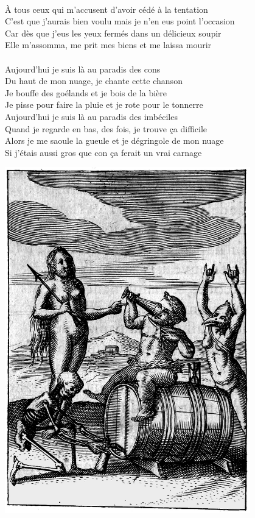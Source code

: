 \\À tous ceux qui m'accusent d'avoir cédé à la tentation
\\C'est que j'aurais bien voulu mais je n'en eus point l'occasion
\\Car dès que j'eus les yeux fermés dans un délicieux soupir
\\Elle m'assomma, me prit mes biens et me laissa mourir
\\\\Aujourd'hui je suis là au paradis des cons
\\Du haut de mon nuage, je chante cette chanson
\\Je bouffe des goélands et je bois de la bière
\\Je pisse pour faire la pluie et je rote pour le tonnerre
\\Aujourd'hui je suis là au paradis des imbéciles
\\Quand je regarde en bas, des fois, je trouve ça difficile
\\Alors je me saoule la gueule et je dégringole de mon nuage
\\Si j'étais aussi gros que con ça ferait un vrai carnage
\bigskip
\bigskip
\begin{center}
\centering
    \includegraphics[width=0.8\textwidth]{images/brev1.png}
 \end{center}
\breakpage